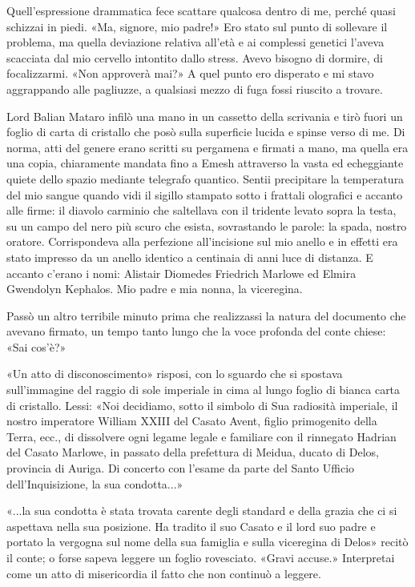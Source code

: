 Quell'espressione drammatica fece scattare qualcosa dentro di me, perché
quasi schizzai in piedi. «Ma, signore, mio padre!» Ero stato sul punto
di sollevare il problema, ma quella deviazione relativa all'età e ai
complessi genetici l'aveva scacciata dal mio cervello intontito dallo
stress. Avevo bisogno di dormire, di focalizzarmi. «Non approverà mai?»
A quel punto ero disperato e mi stavo aggrappando alle pagliuzze, a
qualsiasi mezzo di fuga fossi riuscito a trovare.

Lord Balian Mataro infilò una mano in un cassetto della scrivania e tirò
fuori un foglio di carta di cristallo che posò sulla superficie lucida e
spinse verso di me. Di norma, atti del genere erano scritti su pergamena
e firmati a mano, ma quella era una copia, chiaramente mandata fino a
Emesh attraverso la vasta ed echeggiante quiete dello spazio mediante
telegrafo quantico. Sentii precipitare la temperatura del mio sangue
quando vidi il sigillo stampato sotto i frattali olografici e accanto
alle firme: il diavolo carminio che saltellava con il tridente levato
sopra la testa, su un campo del nero più scuro che esista, sovrastando
le parole: \foreignlanguage{italian}{la spada, nostro oratore.}
Corrispondeva alla perfezione all'incisione sul mio anello e in effetti
era stato impresso da un anello identico a centinaia di anni luce di
distanza. E accanto c'erano i nomi: Alistair Diomedes Friedrich Marlowe
ed Elmira Gwendolyn Kephalos. Mio padre e mia nonna, la viceregina.

Passò un altro terribile minuto prima che realizzassi la natura del
documento che avevano firmato, un tempo tanto lungo che la voce profonda
del conte chiese: «Sai cos'è?»

«Un atto di disconoscimento» risposi, con lo sguardo che si spostava
sull'immagine del raggio di sole imperiale in cima al lungo foglio di
bianca carta di cristallo. Lessi: «Noi decidiamo, sotto il simbolo di
Sua radiosità imperiale, il nostro imperatore William XXIII del Casato
Avent, figlio primogenito della Terra, ecc., di dissolvere ogni legame
legale e familiare con il rinnegato Hadrian del Casato Marlowe, in
passato della prefettura di Meidua, ducato di Delos, provincia di
Auriga. Di concerto con l'esame da parte del Santo Ufficio
dell'Inquisizione, la sua condotta...»

«...la sua condotta è stata trovata carente degli standard e della
grazia che ci si aspettava nella sua posizione. Ha tradito il suo Casato
e il lord suo padre e portato la vergogna sul nome della sua famiglia e
sulla viceregina di Delos» recitò il conte; o forse sapeva leggere un
foglio rovesciato. «Gravi accuse.» Interpretai come un atto di
misericordia il fatto che non continuò a leggere.

